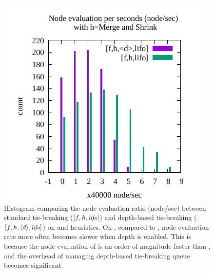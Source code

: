 \begin{figure}[htbp]
 \includegraphics{img/node-sec/mnhiL-mnh_L-hist.pdf}
 \caption{Histogram comparing the node evaluation ratio (node/sec) between standard tie-breaking ($[f,h,{\small\textit{lifo}}]$) and
 depth-based tie-breaking ($[f,h,{\left<d\right>},{\small\textit{lifo}}]$) on \lmcut and \mands heuristics.
 On \mands, compared to \lmcut, node evaluation rate more often becomes
 slower when depth is enabled. This is because the node evaluation of \mands is an order of
 magnitude faster than \lmcut, and the overhead of managing depth-based tie-breaking queue becomes significant.
 }
 \label{fig:expansion-ratio-lifo}
\end{figure}

% 


